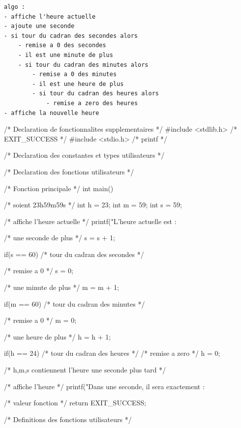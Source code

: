 \begin{correction}
\begin{verbatim}
algo :
- affiche l'heure actuelle
- ajoute une seconde
- si tour du cadran des secondes alors
    - remise a 0 des secondes
    - il est une minute de plus
    - si tour du cadran des minutes alors
        - remise a 0 des minutes
        - il est une heure de plus
        - si tour du cadran des heures alors
    	    - remise a zero des heures
- affiche la nouvelle heure
\end{verbatim}
  \begin{listing}{1}
/* Declaration de fonctionnalites supplementaires */
#include <stdlib.h> /* EXIT_SUCCESS */
#include <stdio.h> /* printf */

/* Declaration des constantes et types utilisateurs */

/* Declaration des fonctions utilisateurs */

/* Fonction principale */
int main()
{
    /* soient 23h59m59s */
    int h = 23;
    int m = 59;
    int s = 59;

    /* affiche l'heure actuelle */
    printf("L'heure actuelle est : %

    /* une seconde de plus */
    s = s + 1;

    if(s == 60) /* tour du cadran des secondes */
    {
	/* remise a 0 */
	s = 0;

	/* une minute de plus */
	m = m + 1;

	if(m == 60) /* tour du cadran des minutes */
	{
	    /* remise a 0 */
	    m = 0;

	    /* une heure de plus */
	    h = h + 1;

	    if(h == 24) /* tour du cadran des heures */
	    {
		/* remise a zero */
		h = 0;
	    }
	}
    }
    /* h,m,s contiennent l'heure une seconde plus tard */

    /* affiche l'heure */
    printf("Dans une seconde, il sera exactement : %

    /* valeur fonction */
    return EXIT_SUCCESS;
}

/* Definitions des fonctions utilisateurs */
  \end{listing}
\end{correction}



